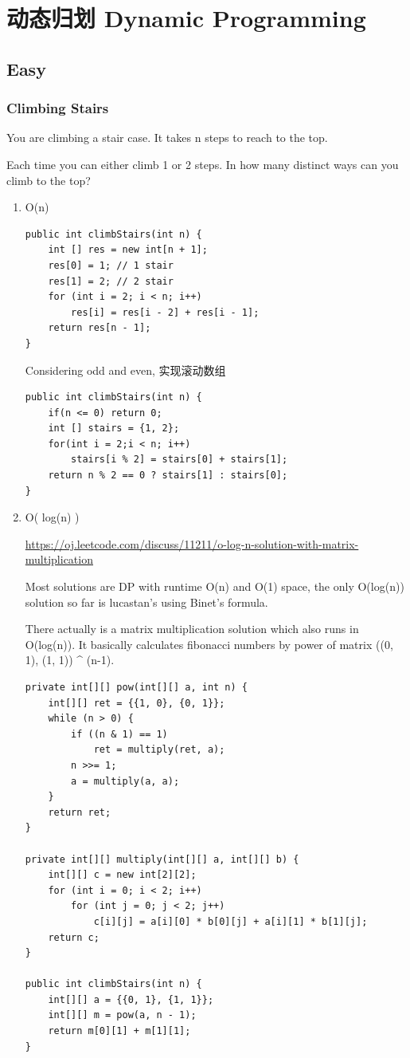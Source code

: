 \documentclass[12pt]{book}
\begin{document}
\chapter{动态归划 Dynamic Programming}
\label{sec-14}
\section{Easy}
\label{sec-14-1}
\subsection{Climbing Stairs}
\label{sec-14-1-1}
You are climbing a stair case. It takes n steps to reach to the top.

Each time you can either climb 1 or 2 steps. In how many distinct ways
can you climb to the top?
\begin{enumerate}
\item O(n)
\label{sec-14-1-1-1}
\lstset{language=java,label= ,caption= ,numbers=none}
\begin{lstlisting}
public int climbStairs(int n) {
    int [] res = new int[n + 1];
    res[0] = 1; // 1 stair
    res[1] = 2; // 2 stair
    for (int i = 2; i < n; i++) 
        res[i] = res[i - 2] + res[i - 1];
    return res[n - 1];
}
\end{lstlisting}

Considering odd and even, 实现滚动数组
\lstset{language=java,label= ,caption= ,numbers=none}
\begin{lstlisting}
public int climbStairs(int n) {
    if(n <= 0) return 0;
    int [] stairs = {1, 2};
    for(int i = 2;i < n; i++)
        stairs[i % 2] = stairs[0] + stairs[1];
    return n % 2 == 0 ? stairs[1] : stairs[0];
}
\end{lstlisting}
\item O( log(n) )
\label{sec-14-1-1-2}

\url{https://oj.leetcode.com/discuss/11211/o-log-n-solution-with-matrix-multiplication}

Most solutions are DP with runtime O(n) and O(1) space, the only O(log(n)) solution so far is lucastan's using Binet's formula.

There actually is a matrix multiplication solution which also runs in O(log(n)). It basically calculates fibonacci numbers by power of matrix ((0, 1), (1, 1)) \^{} (n-1).

\lstset{language=java,label= ,caption= ,numbers=none}
\begin{lstlisting}
private int[][] pow(int[][] a, int n) {
    int[][] ret = {{1, 0}, {0, 1}};
    while (n > 0) {
        if ((n & 1) == 1) 
            ret = multiply(ret, a);
        n >>= 1;
        a = multiply(a, a);
    }
    return ret;
}

private int[][] multiply(int[][] a, int[][] b) {
    int[][] c = new int[2][2];
    for (int i = 0; i < 2; i++) 
        for (int j = 0; j < 2; j++) 
            c[i][j] = a[i][0] * b[0][j] + a[i][1] * b[1][j];
    return c;
}

public int climbStairs(int n) {
    int[][] a = {{0, 1}, {1, 1}};
    int[][] m = pow(a, n - 1);
    return m[0][1] + m[1][1];
}
\end{lstlisting}
\end{enumerate}
\end{document}
